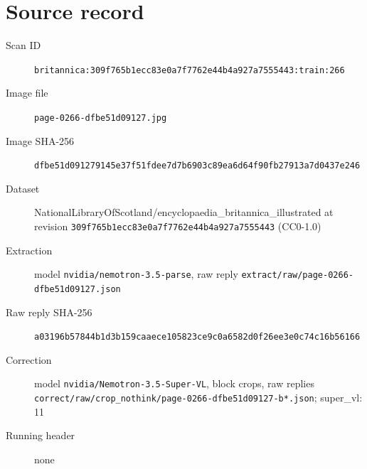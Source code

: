 \documentclass{article}
\begin{document}
\section*{Source record}
\begin{description}
\item[Scan ID] \texttt{britannica:309f765b1ecc83e0a7f7762e44b4a927a7555443:train:266}
\item[Image file] \texttt{page-0266-dfbe51d09127.jpg}
\item[Image SHA-256] \texttt{dfbe51d091279145e37f51fdee7d7b6903c89ea6d64f90fb27913a7d0437e246}
\item[Dataset] NationalLibraryOfScotland/encyclopaedia\_britannica\_illustrated at revision \texttt{309f765b1ecc83e0a7f7762e44b4a927a7555443} (CC0-1.0)
\item[Extraction] model \texttt{nvidia/nemotron-3.5-parse}, raw reply \texttt{extract/raw/page-0266-dfbe51d09127.json}
\item[Raw reply SHA-256] \texttt{a03196b57844b1d3b159caaece105823ce9c0a6582d0f26ee3e0c74c16b56166}
\item[Correction] model \texttt{nvidia/Nemotron-3.5-Super-VL}, block crops, raw replies \texttt{correct/raw/crop\_nothink/page-0266-dfbe51d09127-b*.json}; super\_vl: 11
\item[Running header] none
\end{description}
\end{document}
